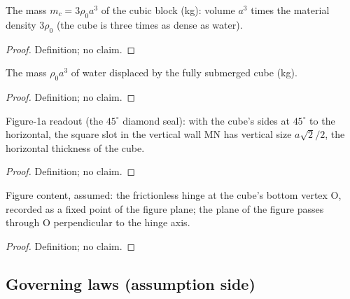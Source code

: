 \begin{definition}
\label{def:IPhO2026Problems_problem_IPhO_2026_1_A_1:cubeMass}
The mass $m_c = 3\rho_0 a^3$ of the cubic block (kg): volume $a^3$ times the
material density $3\rho_0$ (the cube is three times as dense as water).
\end{definition}
\begin{proof}
Definition; no claim.
\end{proof}

\begin{definition}
\label{def:IPhO2026Problems_problem_IPhO_2026_1_A_1:displacedWaterMass}
The mass $\rho_0 a^3$ of water displaced by the fully submerged cube (kg).
\end{definition}
\begin{proof}
Definition; no claim.
\end{proof}

\begin{definition}
\label{def:IPhO2026Problems_problem_IPhO_2026_1_A_1:slotVerticalSize}
Figure-1a readout (the $45^\circ$ diamond seal): with the cube's sides at
$45^\circ$ to the horizontal, the square slot in the vertical wall MN has
vertical size $a\sqrt{2}/2$, the horizontal thickness of the cube.
\end{definition}
\begin{proof}
Definition; no claim.
\end{proof}

\begin{definition}
\label{def:IPhO2026Problems_problem_IPhO_2026_1_A_1:HingeAxis}
Figure content, assumed: the frictionless hinge at the cube's bottom vertex O,
recorded as a fixed point of the figure plane; the plane of the figure passes
through O perpendicular to the hinge axis.
\end{definition}
\begin{proof}
Definition; no claim.
\end{proof}

\subsection*{Governing laws (assumption side)}

